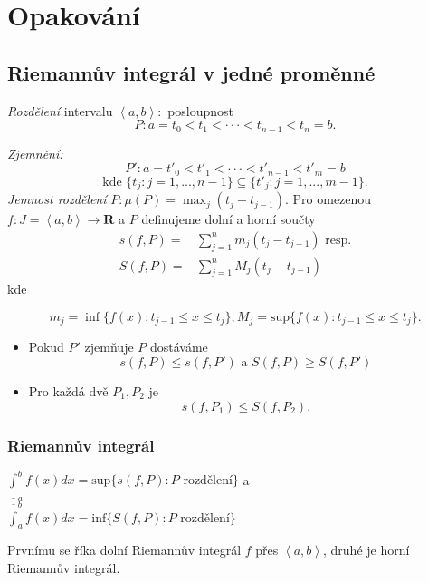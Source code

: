 \documentclass[../main.tex]{subfiles}
\begin{document}
\section{Opakování}
\subsection{Riemannův integrál v jedné proměnné}
\hspace{1.2mm}
\textit{Rozdělení} intervalu $\left<a,b\right> : $ posloupnost 
\[P : a = t_0 < t_1 < \cdot \cdot \cdot < t_{n-1} < t_n = b.\]


{\normalsize
\textit{Zjemnění:
\[P' : a = t'_0 < t'_1 < \cdot \cdot \cdot < t'_{n-1} < t'_m = b\]
\[\text{kde }\{t_j: j = 1,...,n-1\}\subseteq \{t'_j : j = 1,...,m-1\}.\]
}}
\textit{Jemnost rozdělení} $P: \mu(P) = \max_j(t_j-t_{j-1}).$
\noindent
Pro omezenou $f:J=\left<a,b\right> \rightarrow \mathbf{R} $ a $P$ definujeme dolní a horní součty
\begin{align*}
    s(f,P) = & \sum^n_{j=1} m_j(t_j-t_{j-1}) \text{ resp.}\\
    S(f,P) = & \sum^n_{j=1} M_j(t_j-t_{j-1})
\end{align*}
kde

\[m_j = \inf\{f(x) : t_{j-1} \leq x \leq t_j\}, M_j = \text{sup}\{f(x) : t_{j-1} \leq x \leq t_j\}.\]

\begin{itemize}
    \item Pokud $P'$ zjemňuje $P$ dostáváme
    \[s(f,P) \leq s(f,P') \text{ a } S(f,P) \geq S(f,P')\]
    \item Pro každá dvě $P_1, P_2$ je 
    \[s(f,P_1) \leq S(f, P_2).\]
\end{itemize}

\subsubsection{Riemannův integrál}
\hspace{1.2mm}
$\underline{\int}^b_{ a} f(x)dx = \text{sup}\{s(f,P) : P \text{ rozdělení}\}$ a
$\overline{\int}^b_{ a} f(x)dx = \text{inf}\{S(f,P) : P \text{ rozdělení}\}$ 

Prvnímu se říka dolní Riemannův integrál $f$ přes $\left<a,b\right>$, druhé je horní Riemannův integrál.
\end{document}
